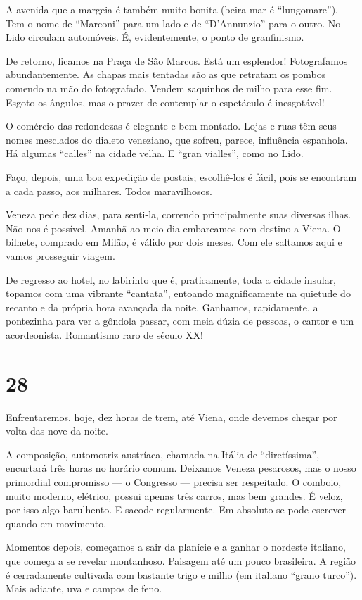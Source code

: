A avenida que a margeia é também muito bonita (beira-mar é ``lungomare''). Tem o nome de ``Marconi'' para um lado e de ``D’Annunzio'' para o outro. No Lido circulam automóveis. É, evidentemente, o ponto de granfinismo.

De retorno, ficamos na Praça de São Marcos. Está um esplendor! Fotografamos abundantemente. As chapas mais tentadas são as que retratam os pombos comendo na mão do fotografado. Vendem saquinhos de milho para esse fim. Esgoto os ângulos, mas o prazer de contemplar o espetáculo é inesgotável!

O comércio das redondezas é elegante e bem montado. Lojas e ruas têm seus nomes mesclados do dialeto veneziano, que sofreu, parece, influência espanhola. Há algumas ``calles'' na cidade velha. E ``gran vialles'', como no Lido.

Faço, depois, uma boa expedição de postais; escolhê-los é fácil, pois se encontram a cada passo, aos milhares. Todos maravilhosos.

Veneza pede dez dias, para senti-la, correndo principalmente suas diversas ilhas. Não nos é possível. Amanhã ao meio-dia embarcamos com destino a Viena. O bilhete, comprado em Milão, é válido por dois meses. Com ele saltamos aqui e vamos prosseguir viagem.

De regresso ao hotel, no labirinto que é, praticamente, toda a cidade insular, topamos com uma vibrante ``cantata'', entoando magnificamente na quietude do recanto e da própria hora avançada da noite. Ganhamos, rapidamente, a pontezinha para ver a gôndola passar, com meia dúzia de pessoas, o cantor e um acordeonista. Romantismo raro de século XX!

\section*{28 \adfflatleafright {}}
Enfrentaremos, hoje, dez horas de trem, até Viena, onde devemos chegar por volta das nove da noite.

A composição, automotriz austríaca, chamada na Itália de ``diretíssima'', encurtará três horas no horário comum. Deixamos Veneza pesarosos, mas o nosso primordial compromisso --- o Congresso --- precisa ser respeitado. O comboio, muito moderno, elétrico, possui apenas três carros, mas bem grandes. É veloz, por isso algo barulhento. E sacode regularmente. Em absoluto se pode escrever quando em movimento.

Momentos depois, começamos a sair da planície e a ganhar o nordeste italiano, que começa a se revelar montanhoso. Paisagem até um pouco brasileira. A região é cerradamente cultivada com bastante trigo e milho (em italiano ``grano turco''). Mais adiante, uva e campos de feno.

